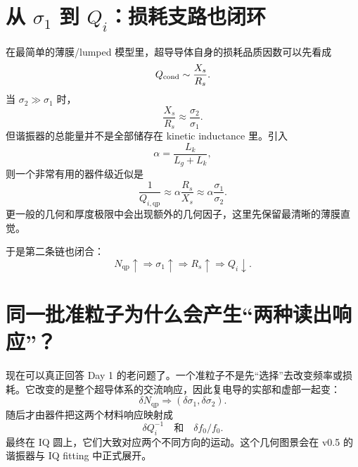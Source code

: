 \documentclass[11pt,a4paper,openany]{ctexrep}
\newcommand{\qp}{\mathrm{qp}}
\begin{document}
\section{从 $\sigma_1$ 到 $Q_i$：损耗支路也闭环}

在最简单的薄膜/lumped 模型里，超导导体自身的损耗品质因数可以先看成
\[
Q_{\rm cond}
\sim
\frac{X_s}{R_s}.
\]
当 $\sigma_2\gg\sigma_1$ 时，
\[
\frac{X_s}{R_s}
\approx
\frac{\sigma_2}{\sigma_1}.
\]
但谐振器的总能量并不是全部储存在 kinetic inductance 里。引入
\[
\alpha=\frac{L_k}{L_g+L_k},
\]
则一个非常有用的器件级近似是
\[
\boxed{
\frac{1}{Q_{i,\qp}}
\approx
\alpha\frac{R_s}{X_s}
\approx
\alpha\frac{\sigma_1}{\sigma_2}.
}
\]
更一般的几何和厚度极限中会出现额外的几何因子，这里先保留最清晰的薄膜直觉。

于是第二条链也闭合：
\[
N_{\qp}\uparrow
\Rightarrow
\sigma_1\uparrow
\Rightarrow
R_s\uparrow
\Rightarrow
Q_i\downarrow.
\]

\begin{center}
\end{center}

\section{同一批准粒子为什么会产生“两种读出响应”？}

现在可以真正回答 Day 1 的老问题了。一个准粒子不是先“选择”去改变频率或损耗。它改变的是整个超导体系的交流响应，因此复电导的实部和虚部一起变：
\[
\delta N_{\qp}
\Rightarrow
\left(\delta\sigma_1,\delta\sigma_2\right).
\]
随后才由器件把这两个材料响应映射成
\[
\boxed{
\delta Q_i^{-1}
\quad\text{和}\quad
\delta f_0/f_0.
}
\]
最终在 IQ 圆上，它们大致对应两个不同方向的运动。这个几何图景会在 v0.5 的谐振器与 IQ fitting 中正式展开。
\end{document}
